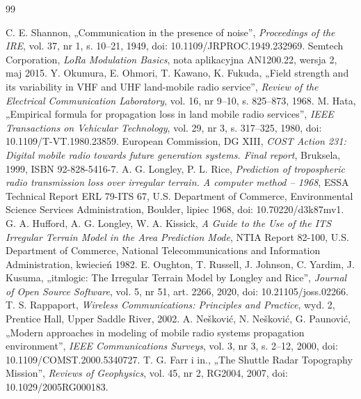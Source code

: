 \documentclass[12pt,a4paper,twoside]{report}
\theoremstyle{definition} %
\begin{document}
    \begin{thebibliography}{99}
     C. E. Shannon, „Communication in the presence of noise”, \emph{Proceedings of the IRE}, vol. 37, nr 1, s. 10--21, 1949, doi: 10.1109/JRPROC.1949.232969.
     Semtech Corporation, \emph{LoRa Modulation Basics}, nota aplikacyjna AN1200.22, wersja 2, maj 2015.
     Y. Okumura, E. Ohmori, T. Kawano, K. Fukuda, „Field strength and its variability in VHF and UHF land-mobile radio service”, \emph{Review of the Electrical Communication Laboratory}, vol. 16, nr 9--10, s. 825--873, 1968.
     M. Hata, „Empirical formula for propagation loss in land mobile radio services”, \emph{IEEE Transactions on Vehicular Technology}, vol. 29, nr 3, s. 317--325, 1980, doi: 10.1109/T-VT.1980.23859.
     European Commission, DG XIII, \emph{COST Action 231: Digital mobile radio towards future generation systems. Final report}, Bruksela, 1999, ISBN 92-828-5416-7.
     A. G. Longley, P. L. Rice, \emph{Prediction of tropospheric radio transmission loss over irregular terrain. A computer method -- 1968}, ESSA Technical Report ERL 79-ITS 67, U.S. Department of Commerce, Environmental Science Services Administration, Boulder, lipiec 1968, doi: 10.70220/d3k87mv1.
     G. A. Hufford, A. G. Longley, W. A. Kissick, \emph{A Guide to the Use of the ITS Irregular Terrain Model in the Area Prediction Mode}, NTIA Report 82-100, U.S. Department of Commerce, National Telecommunications and Information Administration, kwiecień 1982.
     E. Oughton, T. Russell, J. Johnson, C. Yardim, J. Kusuma, „itmlogic: The Irregular Terrain Model by Longley and Rice”, \emph{Journal of Open Source Software}, vol. 5, nr 51, art. 2266, 2020, doi: 10.21105/joss.02266.
     T. S. Rappaport, \emph{Wireless Communications: Principles and Practice}, wyd. 2, Prentice Hall, Upper Saddle River, 2002.
     A. Nešković, N. Nešković, G. Paunović, „Modern approaches in modeling of mobile radio systems propagation environment”, \emph{IEEE Communications Surveys}, vol. 3, nr 3, s. 2--12, 2000, doi: 10.1109/COMST.2000.5340727.
     T. G. Farr i in., „The Shuttle Radar Topography Mission”, \emph{Reviews of Geophysics}, vol. 45, nr 2, RG2004, 2007, doi: 10.1029/2005RG000183.

\end{thebibliography}
\end{document}
